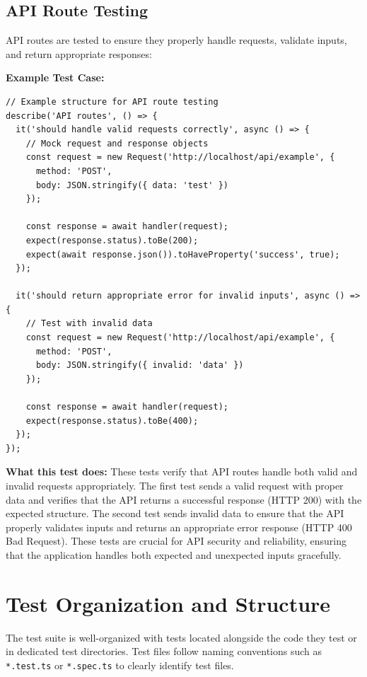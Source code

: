 \subsection{API Route Testing}

API routes are tested to ensure they properly handle requests, validate inputs, and return appropriate responses:

\textbf{Example Test Case:}
\begin{verbatim}
// Example structure for API route testing
describe('API routes', () => {
  it('should handle valid requests correctly', async () => {
    // Mock request and response objects
    const request = new Request('http://localhost/api/example', {
      method: 'POST',
      body: JSON.stringify({ data: 'test' })
    });

    const response = await handler(request);
    expect(response.status).toBe(200);
    expect(await response.json()).toHaveProperty('success', true);
  });

  it('should return appropriate error for invalid inputs', async () => {
    // Test with invalid data
    const request = new Request('http://localhost/api/example', {
      method: 'POST',
      body: JSON.stringify({ invalid: 'data' })
    });

    const response = await handler(request);
    expect(response.status).toBe(400);
  });
});
\end{verbatim}

\textbf{What this test does:} These tests verify that API routes handle both valid and invalid requests appropriately. The first test sends a valid request with proper data and verifies that the API returns a successful response (HTTP 200) with the expected structure. The second test sends invalid data to ensure that the API properly validates inputs and returns an appropriate error response (HTTP 400 Bad Request). These tests are crucial for API security and reliability, ensuring that the application handles both expected and unexpected inputs gracefully.

\section{Test Organization and Structure}

The test suite is well-organized with tests located alongside the code they test or in dedicated test directories. Test files follow naming conventions such as \texttt{*.test.ts} or \texttt{*.spec.ts} to clearly identify test files.


